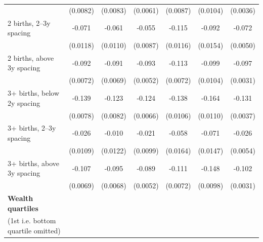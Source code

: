 {\begin{tabular}{l*{6}{c}}
                    &    (0.0082)         &    (0.0083)         &    (0.0061)         &    (0.0087)         &    (0.0104)         &    (0.0036)         \\
\addlinespace
\hspace*{1em}2 births, 2–3y spacing&      -0.071\sym{***}&      -0.061\sym{***}&      -0.055\sym{***}&      -0.115\sym{***}&      -0.092\sym{***}&      -0.072\sym{***}\\
                    &    (0.0118)         &    (0.0110)         &    (0.0087)         &    (0.0116)         &    (0.0154)         &    (0.0050)         \\
\addlinespace
\hspace*{1em}2 births, above 3y spacing&      -0.092\sym{***}&      -0.091\sym{***}&      -0.093\sym{***}&      -0.113\sym{***}&      -0.099\sym{***}&      -0.097\sym{***}\\
                    &    (0.0072)         &    (0.0069)         &    (0.0052)         &    (0.0072)         &    (0.0104)         &    (0.0031)         \\
\addlinespace
\hspace*{1em}3+ births, below 2y spacing&      -0.139\sym{***}&      -0.123\sym{***}&      -0.124\sym{***}&      -0.138\sym{***}&      -0.164\sym{***}&      -0.131\sym{***}\\
                    &    (0.0078)         &    (0.0082)         &    (0.0066)         &    (0.0106)         &    (0.0110)         &    (0.0037)         \\
\addlinespace
\hspace*{1em}3+ births, 2–3y spacing&      -0.026\sym{*}  &      -0.010         &      -0.021\sym{*}  &      -0.058\sym{***}&      -0.071\sym{***}&      -0.026\sym{***}\\
                    &    (0.0109)         &    (0.0122)         &    (0.0099)         &    (0.0164)         &    (0.0147)         &    (0.0054)         \\
\addlinespace
\hspace*{1em}3+ births, above 3y spacing&      -0.107\sym{***}&      -0.095\sym{***}&      -0.089\sym{***}&      -0.111\sym{***}&      -0.148\sym{***}&      -0.102\sym{***}\\
                    &    (0.0069)         &    (0.0068)         &    (0.0052)         &    (0.0072)         &    (0.0098)         &    (0.0031)         \\
\addlinespace
\textbf{Wealth quartiles} \\ (1st i.e. bottom quartile omitted)&                     &                     &                     &                     &                     &                     \\

\end{tabular}}
